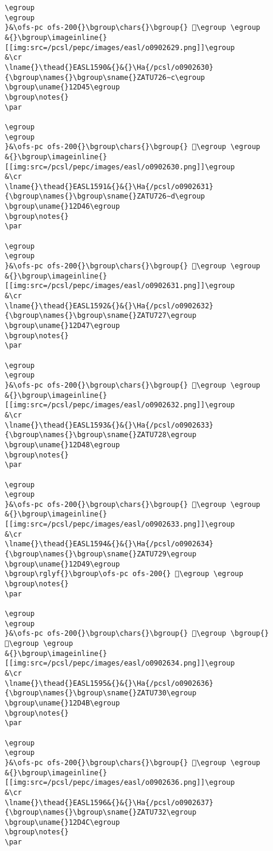 \begin{verbatim}
\egroup
\egroup
}&\ofs-pc ofs-200{}\bgroup\chars{}\bgroup{} 𒵄\egroup \egroup
&{}\bgroup\imageinline{}[[img:src=/pcsl/pepc/images/easl/o0902629.png]]\egroup
&\cr
\lname{}\thead{}EASL1590&{}&{}\Ha{/pcsl/o0902630}{\bgroup\names{}\bgroup\sname{}ZATU726∼c\egroup
\bgroup\uname{}12D45\egroup
\bgroup\notes{}
\par 

\egroup
\egroup
}&\ofs-pc ofs-200{}\bgroup\chars{}\bgroup{} 𒵅\egroup \egroup
&{}\bgroup\imageinline{}[[img:src=/pcsl/pepc/images/easl/o0902630.png]]\egroup
&\cr
\lname{}\thead{}EASL1591&{}&{}\Ha{/pcsl/o0902631}{\bgroup\names{}\bgroup\sname{}ZATU726∼d\egroup
\bgroup\uname{}12D46\egroup
\bgroup\notes{}
\par 

\egroup
\egroup
}&\ofs-pc ofs-200{}\bgroup\chars{}\bgroup{} 𒵆\egroup \egroup
&{}\bgroup\imageinline{}[[img:src=/pcsl/pepc/images/easl/o0902631.png]]\egroup
&\cr
\lname{}\thead{}EASL1592&{}&{}\Ha{/pcsl/o0902632}{\bgroup\names{}\bgroup\sname{}ZATU727\egroup
\bgroup\uname{}12D47\egroup
\bgroup\notes{}
\par 

\egroup
\egroup
}&\ofs-pc ofs-200{}\bgroup\chars{}\bgroup{} 𒵇\egroup \egroup
&{}\bgroup\imageinline{}[[img:src=/pcsl/pepc/images/easl/o0902632.png]]\egroup
&\cr
\lname{}\thead{}EASL1593&{}&{}\Ha{/pcsl/o0902633}{\bgroup\names{}\bgroup\sname{}ZATU728\egroup
\bgroup\uname{}12D48\egroup
\bgroup\notes{}
\par 

\egroup
\egroup
}&\ofs-pc ofs-200{}\bgroup\chars{}\bgroup{} 𒵈\egroup \egroup
&{}\bgroup\imageinline{}[[img:src=/pcsl/pepc/images/easl/o0902633.png]]\egroup
&\cr
\lname{}\thead{}EASL1594&{}&{}\Ha{/pcsl/o0902634}{\bgroup\names{}\bgroup\sname{}ZATU729\egroup
\bgroup\uname{}12D49\egroup
\bgroup\rglyf{}\bgroup\ofs-pc ofs-200{} 𒵉\egroup \egroup
\bgroup\notes{}
\par 

\egroup
\egroup
}&\ofs-pc ofs-200{}\bgroup\chars{}\bgroup{} 𒵉\egroup \bgroup{} 𒵊\egroup \egroup
&{}\bgroup\imageinline{}[[img:src=/pcsl/pepc/images/easl/o0902634.png]]\egroup
&\cr
\lname{}\thead{}EASL1595&{}&{}\Ha{/pcsl/o0902636}{\bgroup\names{}\bgroup\sname{}ZATU730\egroup
\bgroup\uname{}12D4B\egroup
\bgroup\notes{}
\par 

\egroup
\egroup
}&\ofs-pc ofs-200{}\bgroup\chars{}\bgroup{} 𒵋\egroup \egroup
&{}\bgroup\imageinline{}[[img:src=/pcsl/pepc/images/easl/o0902636.png]]\egroup
&\cr
\lname{}\thead{}EASL1596&{}&{}\Ha{/pcsl/o0902637}{\bgroup\names{}\bgroup\sname{}ZATU732\egroup
\bgroup\uname{}12D4C\egroup
\bgroup\notes{}
\par 


\end{verbatim}
